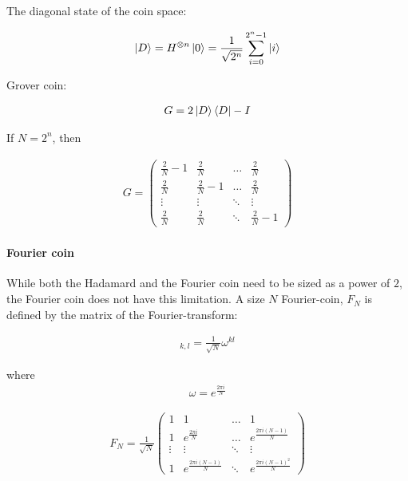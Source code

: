 The diagonal state of the coin space:

\begin{align}
    \ket{D} = H^{\otimes{}n}\ket{0} = \frac{1}{\sqrt{2^n}} \sum\limits_{i=0}^{2^n-1} \ket{i}
\end{align}

Grover coin:

\begin{align}
    G = 2\ket{D}\bra{D} - I
\end{align}

If $N = 2^n$, then

\begin{align}
  G = \begin{pmatrix}
      \frac{2}{N} - 1 & \frac{2}{N} & \dots  & \frac{2}{N} \\
      \frac{2}{N} & \frac{2}{N} - 1 & \dots  & \frac{2}{N} \\
      \vdots & \vdots & \ddots & \vdots \\
      \frac{2}{N} & \frac{2}{N} & \ddots & \frac{2}{N} - 1
    \end{pmatrix}
\end{align}

\paragraph{Fourier coin}

While both the Hadamard and the Fourier coin need to be sized as a power of $2$, the Fourier coin does not have this limitation. A size $N$ Fourier-coin, $F_N$ is defined by the matrix of the Fourier-transform:


\begin{align}
[F_N]_{k,l} = \frac{1}{\sqrt{N}} \omega^{kl}
\end{align}

where 
\begin{align}
    \omega = e^{\frac{2\pi{}i}{N}}
\end{align}

\begin{align}
  F_N = \frac{1}{\sqrt{N}}\begin{pmatrix}
      1 &  1 & \dots  & 1 \\
      1 &  e^{\frac{2\pi{}i}{N}} & \dots  & e^{\frac{2\pi{}i(N-1)}{N}} \\
      \vdots & \vdots & \ddots & \vdots \\
      1 &  e^{\frac{2\pi{}i(N-1)}{N}} & \ddots & e^{\frac{2\pi{}i(N-1)^2}{N}}
    \end{pmatrix}
\end{align}

